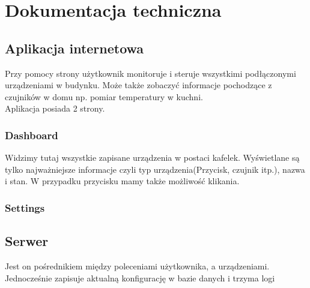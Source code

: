 \chapter{Dokumentacja techniczna}%
\section{Aplikacja internetowa}
Przy pomocy strony użytkownik monitoruje i steruje wszystkimi podłączonymi urządzeniami w budynku. Może także zobaczyć informacje pochodzące z czujników w domu np. pomiar temperatury w kuchni. \\
Aplikacja posiada 2 strony.
\subsection{Dashboard}
Widzimy tutaj wszystkie zapisane urządzenia w postaci kafelek. Wyświetlane są tylko najważniejsze informacje czyli typ urządzenia(Przycisk, czujnik itp.), nazwa i stan. W przypadku przycisku mamy także możliwość klikania. 
\subsection{Settings}
\section{Serwer}
Jest on pośrednikiem między poleceniami użytkownika, a urządzeniami. Jednocześnie zapisuje aktualną konfigurację w bazie danych i trzyma logi